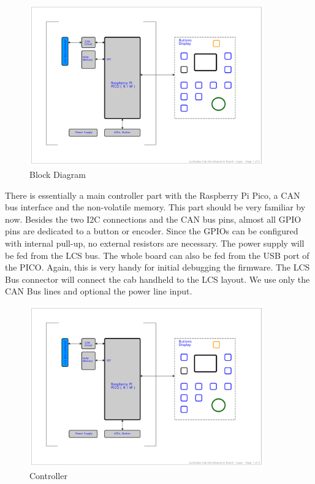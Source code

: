 \begin{figure}[ht]
    \centering
    \includegraphics[page=1, width=0.9\textwidth]{./Schematics/Schematic_LcsNodes-Cab-Dev.pdf}
    \caption{Block Diagram}
\end{figure}

There is essentially a main controller part with the Raspberry Pi Pico, a CAN bus interface and the non-volatile memory. This part should be very familiar by now. Besides the two I2C connections and the CAN bus pins, almost all GPIO pins are dedicated to a button or encoder. Since the GPIOs can be configured with internal pull-up, no external resistors are necessary. The power supply will be fed from the LCS bus. The whole board can also be fed from the USB port of the PICO. Again, this is very handy for initial debugging the firmware. The LCS Bus connector will connect the cab handheld to the LCS layout. We use only the CAN Bus lines and optional the power line input.

\begin{figure}[htbp]
    \centering
    \includegraphics[page=2, width=0.9\textwidth]{./Schematics/Schematic_LcsNodes-Cab-Dev.pdf}
    \caption{Controller}
\end{figure}
\FloatBarrier

